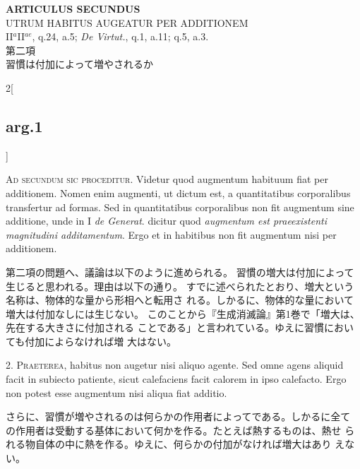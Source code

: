 \documentclass[paper=a4paper,fontsize=10pt,jafontsize=9pt,titlepage]{jlreq}
\begin{document}
\begin{center}
{\Large {\bfseries ARTICULUS SECUNDUS}}\\
{\large UTRUM HABITUS AUGEATUR PER ADDITIONEM}\\
{\footnotesize II$^{a}$II$^{ae}$, q.24, a.5; {\itshape De Virtut.},
 q.1, a.11; q.5, a.3.}\\
{\Large 第二項\\習慣は付加によって増やされるか}
\end{center}

\begin{paracol}{2}[\subsection{arg.1}]

{\scshape Ad secundum sic proceditur}. Videtur quod augmentum habituum fiat per
additionem. Nomen enim augmenti, ut dictum est, a quantitatibus
corporalibus transfertur ad formas. Sed in quantitatibus corporalibus
non fit augmentum sine additione, unde in I {\itshape de Generat}. dicitur quod
{\itshape augmentum est praeexistenti magnitudini additamentum}. Ergo et in
habitibus non fit augmentum nisi per additionem.

\switchcolumn

第二項の問題へ、議論は以下のように進められる。
習慣の増大は付加によって生じると思われる。理由は以下の通り。
すでに述べられたとおり、増大という名称は、物体的な量から形相へと転用さ
 れる。しかるに、物体的な量において増大は付加なしには生じない。
このことから『生成消滅論』第1巻で「増大は、先在する大きさに付加される
 ことである」と言われている。ゆえに習慣においても付加によらなければ増
 大はない。


2. {\scshape Praeterea}, habitus non augetur nisi aliquo agente. Sed omne agens
aliquid facit in subiecto patiente, sicut calefaciens facit calorem in
ipso calefacto. Ergo non potest esse augmentum nisi aliqua fiat
additio.

\switchcolumn

さらに、習慣が増やされるのは何らかの作用者によってである。しかるに全て
 の作用者は受動する基体において何かを作る。たとえば熱するものは、熱せ
 られる物自体の中に熱を作る。ゆえに、何らかの付加がなければ増大はあり
 えない。


\end{paracol}
\end{document}
